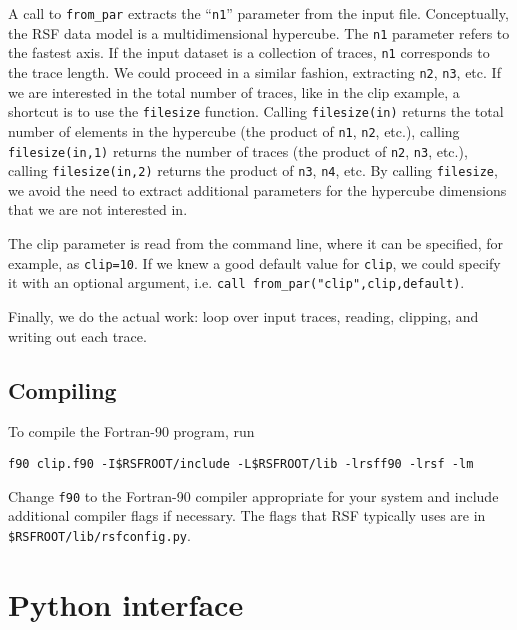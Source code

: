 
A call to \texttt{from\_par} extracts the ``\texttt{n1}'' parameter
from the input file. Conceptually, the RSF data model is a
multidimensional hypercube.  The \texttt{n1} parameter refers to the
fastest axis. If the input dataset is a collection of traces,
\texttt{n1} corresponds to the trace length. We could proceed in a
similar fashion, extracting \texttt{n2}, \texttt{n3}, etc. If we are
interested in the total number of traces, like in the clip example, a
shortcut is to use the \texttt{filesize} function.  Calling
\texttt{filesize(in)} returns the total number of elements in the
hypercube (the product of \texttt{n1}, \texttt{n2}, etc.), calling
\texttt{filesize(in,1)} returns the number of traces (the product of
\texttt{n2}, \texttt{n3}, etc.), calling \texttt{filesize(in,2)}
returns the product of \texttt{n3}, \texttt{n4}, etc. By calling
\texttt{filesize}, we avoid the need to extract additional parameters
for the hypercube dimensions that we are not interested in.


The clip parameter is read from the command line, where it can be
specified, for example, as \texttt{clip=10}. If we knew a good default
value for \texttt{clip}, we could specify it with an optional
argument, i.e. \texttt{call~from\_par("clip",clip,default)}.


Finally, we do the actual work: loop over input traces, reading,
clipping, and writing out each trace.

\subsection{Compiling}
To compile the Fortran-90 program, run
\begin{verbatim}
f90 clip.f90 -I$RSFROOT/include -L$RSFROOT/lib -lrsff90 -lrsf -lm
\end{verbatim}
Change \texttt{f90} to the Fortran-90 compiler appropriate for your system and
include additional compiler flags if necessary. The flags that RSF typically
uses are in \texttt{\$RSFROOT/lib/rsfconfig.py}.

\section{Python interface}

\lstset{language=python}

